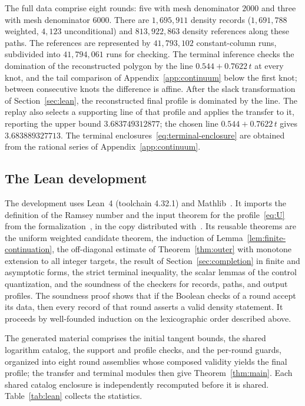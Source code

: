 \documentclass[11pt]{article}
\theoremstyle{definition}
\theoremstyle{remark}
\numberwithin{equation}{section}
\begin{document}
The full data comprise eight rounds: five with mesh denominator
$2000$ and three with mesh denominator $6000$. There are
$1{,}695{,}911$ density records ($1{,}691{,}788$ weighted,
$4{,}123$ unconditional) and $813{,}922{,}863$ density
references along these paths. The references are represented by
$41{,}793{,}102$ constant-column runs, subdivided into
$41{,}794{,}061$ runs for checking. The terminal inference checks the
domination of the reconstructed polygon by the line
$0.544+0.7622\,t$ at every knot,
and the tail comparison of Appendix~\ref{app:continuum} below the
first knot; between consecutive knots the difference is affine. After
the slack transformation of Section~\ref{sec:lean}, the reconstructed
final profile is dominated by the line. The replay also selects a
supporting line of that profile and applies the transfer to it,
reporting the upper bound $3.683749312877$; the chosen line
$0.544+0.7622\,t$ gives $3.683889327713$. The terminal
enclosures~\eqref{eq:terminal-enclosure} are obtained from the
rational series of Appendix~\ref{app:continuum}.

\subsection{The Lean development}

The development uses Lean~4 (toolchain 4.32.1) and
Mathlib~\cite{mathlib}. It imports the definition of the Ramsey number
and the input theorem for the profile~\eqref{eq:U} from the
formalization~\cite{GNNWLean}, in the copy distributed with~\cite{NSS}.
Its reusable theorems are the uniform weighted candidate theorem, the induction of
Lemma~\ref{lem:finite-continuation}, the off-diagonal estimate of
Theorem~\ref{thm:outer} with monotone extension to all integer
targets, the result of Section~\ref{sec:completion} in finite and
asymptotic forms, the strict terminal inequality, the scalar lemmas
of the control quantization, and the soundness of the checkers for
records, paths, and output profiles. The soundness proof shows that
if the Boolean checks of a round accept its data, then every record
of that round asserts a valid density statement. It proceeds by
well-founded induction on the lexicographic order described above.

The generated
material comprises the initial tangent bounds, the shared logarithm
catalog, the support and profile checks, and the per-round guards,
organized into eight round assemblies whose composed validity yields
the final profile; the transfer and terminal modules then give
Theorem~\ref{thm:main}. Each shared catalog enclosure is
independently recomputed before it is shared.
Table~\ref{tab:lean} collects the statistics.
\end{document}
